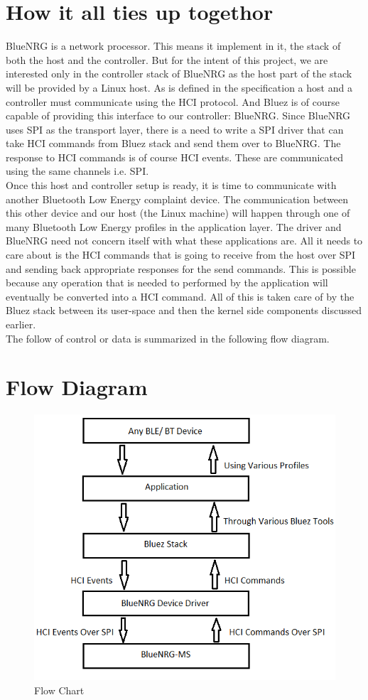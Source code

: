 \section{How it all ties up togethor}
BlueNRG is a network processor. This means it implement in it, the stack of both the host and the controller. But for the intent of this project, we are interested only in the controller stack of BlueNRG as the host part of the stack will be provided by a Linux host. As is defined in the specification a host and a controller must communicate using the HCI protocol. And Bluez is of course capable of providing this interface to our controller: BlueNRG. Since BlueNRG uses SPI as the transport layer, there is a need to write a SPI driver that can take HCI commands from Bluez stack and send them over to BlueNRG. The response to HCI commands is of course HCI events. These are communicated using the same channels i.e. SPI. \\
Once this host and controller setup is ready, it is time to communicate with another Bluetooth Low Energy complaint device. The communication between this other device and our host (the Linux machine) will happen through one of many Bluetooth Low Energy profiles in the application layer. The driver and BlueNRG need not concern itself with what these applications are. All it needs to care about is the HCI commands that is going to receive from the host over SPI and sending back appropriate responses for the send commands. This is possible because any operation that is needed to performed by the application will eventually be converted into a HCI command. All of this is taken care of by the Bluez stack between its user-space and then the kernel side components discussed earlier. \\
The follow of control or data is summarized in the following flow diagram.
\section{Flow Diagram}
\begin{figure}[ht]
	\centering
	\includegraphics[scale=0.5]{images/flow_chart.png}
	\caption{Flow Chart}
\end{figure}
